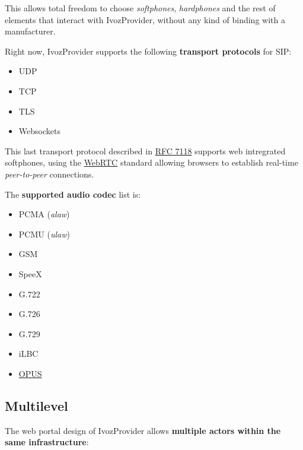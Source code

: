 \documentclass[letterpaper,10pt,english]{sphinxmanual}
\begin{document}
This allows total freedom to choose \emph{softphones}, \emph{hardphones} and the
rest of elements that interact with IvozProvider, without any kind of
binding with a manufacturer.

Right now, IvozProvider supports the following \textbf{transport protocols}
for SIP:
\begin{itemize}
\item {} 
UDP

\item {} 
TCP

\item {} 
TLS

\item {} 
Websockets

\end{itemize}

This last transport protocol described in \href{https://tools.ietf.org/html/rfc7118}{RFC 7118} supports web intregrated
softphones, using the \href{https://webrtc.org/}{WebRTC} standard allowing
browsers to establish real-time \emph{peer-to-peer} connections.

The \textbf{supported audio codec} list is:
\begin{itemize}
\item {} 
PCMA (\emph{alaw})

\item {} 
PCMU (\emph{ulaw})

\item {} 
GSM

\item {} 
SpeeX

\item {} 
G.722

\item {} 
G.726

\item {} 
G.729

\item {} 
iLBC

\item {} 
\href{http://opus-codec.org/}{OPUS}

\end{itemize}


\subsection{Multilevel}
\label{basics/intro/what_is_ivozprovider:multilevel}
The web portal design of IvozProvider allows \textbf{multiple actors within the
same infrastructure}:
\end{document}
